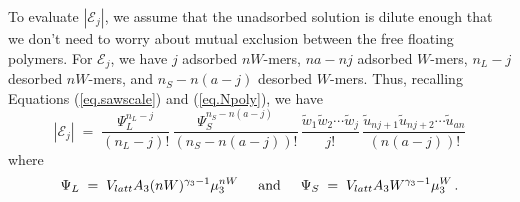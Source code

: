 \documentclass[journal=jacsat,manuscript=article]{achemso}
\begin{document}
To evaluate $|\mathcal{E}_j|$, we assume that the unadsorbed solution
is dilute enough that we don't need to worry about mutual exclusion between the free floating
polymers.   
For $\mathcal{E}_j$, we have $j$ adsorbed $nW$-mers, $na-nj$ adsorbed $W$-mers, 
$n_L-j$ desorbed $nW$-mers, and $n_S-n(a-j)$ desorbed $W$-mers.   Thus, recalling 
Equations (\ref{eq.sawscale}) and  (\ref{eq.Npoly}), we have
\begin{equation}
    |\mathcal{E}_j|  
      \; = \; \frac{ \Psi_L^{n_L-j} }{(n_L-j)!} \,
          \frac{ \Psi_S^{n_S-n(a-j)} }{(n_S-n(a-j))!} \,
           \frac{\tilde{w}_1\tilde{w}_2\cdots \tilde{w}_j}{j!}
                     \,   \frac{\tilde{u}_{nj+1}\tilde{u}_{nj+2}\cdots \tilde{u}_{an}}{(n(a-j))!}
        \label{eq.Yj}
\end{equation}
where 
\begin{equation}
    \label{eq.psidef}   
   \Psi_L\;=\;V_{latt} A_3 (nW)^{\gamma_3-1} \mu_{3}^{nW}   
    \hspace{5mm}\hbox{and} \hspace{5mm}
     \Psi_S \;=\; V_{latt}A_3W^{\gamma_3-1}\mu_3^W \,.
\end{equation}
\end{document}
